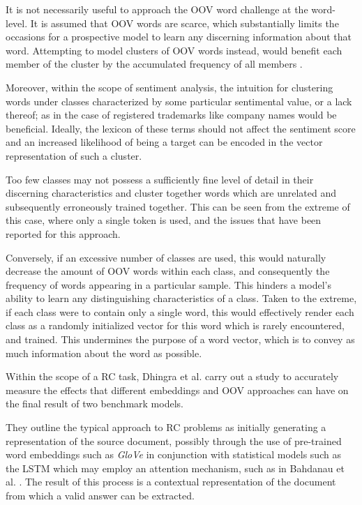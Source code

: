 \documentclass[../../fyp.tex]{subfiles}
\begin{document}
It is not necessarily useful to approach the OOV word challenge at the word-level. It is assumed that OOV words are scarce, which substantially limits the occasions for a prospective model to learn any discerning information about that word. Attempting to model clusters of OOV words instead, would benefit each member of the cluster by the accumulated frequency of all members \cite{naptali2012}.

Moreover, within the scope of sentiment analysis, the intuition for clustering words under classes characterized by some particular sentimental value, or a lack thereof; as in the case of registered trademarks like company names would be beneficial. Ideally, the lexicon of these terms should not affect the sentiment score and an increased likelihood of being a target can be encoded in the vector representation of such a cluster. 

Too few classes may not possess a sufficiently fine level of detail in their discerning characteristics and cluster together words which are unrelated and subsequently erroneously trained together. This can be seen from the extreme of this case, where only a single token is used, and the issues that have been reported for this approach.

Conversely, if an excessive number of classes are used, this would naturally decrease the amount of OOV words within each class, and consequently the frequency of words appearing in a particular sample. This hinders a model's ability to learn any distinguishing characteristics of a class. Taken to the extreme, if each class were to contain only a single word, this would effectively render each class as a randomly initialized vector for this word which is rarely encountered, and trained. This undermines the purpose of a word vector, which is to convey as much information about the word as possible.

Within the scope of a RC task, Dhingra et al. \cite{bhuwandhingra2017} carry out a study to accurately measure the effects that different embeddings and OOV approaches can have on the final result of two benchmark models.

They outline the typical approach to RC problems as initially generating a representation of the source document, possibly through the use of pre-trained word embeddings such as \textit{GloVe} in conjunction with statistical models such as the LSTM \cite{hochreiter1997} which may employ an attention mechanism, such as in Bahdanau et al. \cite{bahdanau2014}. The result of this process is a contextual representation of the document from which a valid answer can be extracted.
\end{document}
